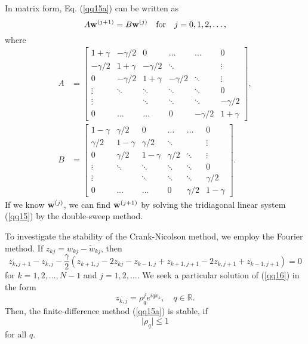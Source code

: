    
In matrix form, Eq. (\ref{qq15a}) can be
written as
\begin{equation}
A{\bf w}^{(j+1)}=B{\bf w}^{(j)} \quad \hbox{for} \quad
j=0,1,2,\dots, \label{qq15}
\end{equation}
where
\[\begin{split}
A&=\left[
\begin{array}{cccccc}
1+\gamma &-\gamma/2 &0      &\dots  &\dots &0 \\
-\gamma/2 &1+\gamma &-\gamma/2 &\ddots  &     &\vdots \\
0      &-\gamma/2 &1+\gamma &-\gamma/2 &\ddots &\vdots \\
\vdots &\ddots &\ddots &\ddots &\ddots &0 \\
\vdots &       &\ddots &\ddots &\ddots &-\gamma/2 \\
0      &\dots  &\dots  &0      &-\gamma/2 &1+\gamma
\end{array}\right], \\
B&=\left[
\begin{array}{cccccc}
1-\gamma &\gamma/2 &0      &\dots  &\dots &0 \\
\gamma/2 &1-\gamma &\gamma/2 &\ddots  &     &\vdots \\
0      &\gamma/2 &1-\gamma &\gamma/2 &\ddots &\vdots \\
\vdots &\ddots &\ddots &\ddots &\ddots &0 \\
\vdots &       &\ddots &\ddots &\ddots &\gamma/2 \\
0      &\dots  &\dots  &0      &\gamma/2 &1-\gamma
\end{array}\right].
\end{split}\]
If we know ${\bf w}^{(j)}$, we can find ${\bf w}^{(j+1)}$ by solving the tridiagonal linear
system (\ref{qq15}) by the double-sweep method.

\vskip 0.5cm  
To investigate the stability of the Crank-Nicolson method, we employ
the Fourier method. If $z_{kj}=w_{kj}-\tilde{w}_{kj}$, then
\begin{equation}
z_{k,j+1}-z_{k,j}-\frac{\gamma}{2} \left(z_{k+1,
j}-2z_{kj}-z_{k-1,j}+ z_{k+1, j+1}-2z_{k,j+1}+z_{k-1,j+1}\right)=0
\label{qq16}
\end{equation}
for $k=1,2, \dots, N-1$ and $j=1,2, \dots$. We seek a particular
solution of (\ref{qq16}) in the form
\begin{equation}
z_{k,j}=\rho_{q}^{j}e^{iqx_{k}}, \quad q\in{\mathbb R}. \label{qq17}
\end{equation}
Then, the finite-difference method (\ref{qq15a}) is
stable, if
\[
\vert\rho_{q}\vert\leq 1
\]
for all $q$.

